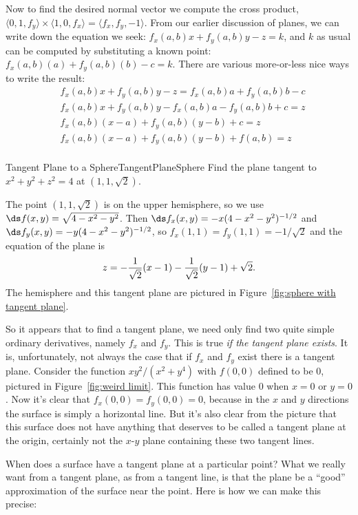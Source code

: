Now to find the desired normal vector we compute the cross product,
$\langle 0,1,f_y\rangle\times\langle 1,0,f_x\rangle=
\langle f_x,f_y,-1\rangle$. From our earlier discussion of planes, we
can write down the equation we seek: $f_x(a,b)x+f_y(a,b)y-z=k$, and
$k$ as usual can be computed by substituting a known point:
$f_x(a,b)(a)+f_y(a,b)(b)-c=k$. There are various more-or-less nice
ways to write the result:
\begin{align*}
&f_x(a,b)x+f_y(a,b)y-z=f_x(a,b)a+f_y(a,b)b-c	\\
&f_x(a,b)x+f_y(a,b)y-f_x(a,b)a-f_y(a,b)b+c=z	\\
&f_x(a,b)(x-a)+f_y(a,b)(y-b)+c=z	\\
&f_x(a,b)(x-a)+f_y(a,b)(y-b)+f(a,b)=z	\\
\end{align*}

\begin{example}{Tangent Plane to a Sphere}{TangentPlaneSphere}
Find the plane tangent to $x^2+y^2+z^2=4$ at
$(1,1,\sqrt2)$.
\end{example}
\begin{solution}
The point $(1,1,\sqrt2)$ is on the upper hemisphere, so 
we use $\ds f(x,y)=\sqrt{4-x^2-y^2}$. Then 
$\ds f_x(x,y)=-x(4-x^2-y^2)^{-1/2}$ and $\ds
f_y(x,y)=-y(4-x^2-y^2)^{-1/2}$, so $f_x(1,1)=f_y(1,1)=-1/\sqrt2$
and the equation of the plane is 
$$z=-{1\over\sqrt2}(x-1)-{1\over\sqrt2}(y-1)+\sqrt2.$$
The hemisphere and this tangent plane are pictured in
Figure~\ref{fig:sphere with tangent plane}.
\end{solution}

So it appears that to find a tangent plane, we need only find two
quite simple ordinary derivatives, namely $f_x$ and $f_y$. This is
true {\em if the tangent plane exists}. It is, unfortunately, not
always the
case that if $f_x$ and $f_y$ exist there is a tangent plane. 
Consider the function  $xy^2/(x^2+y^4)$ with $f(0,0)$ defined to be 0, pictured in 
Figure~\ref{fig:weird limit}. This function has value 0 when $x=0$
or $y=0$. Now it's clear that $f_x(0,0)=f_y(0,0)=0$, because in the
$x$ and $y$ directions the surface is simply a horizontal line. But
it's also clear from the picture that this surface does not have
anything that deserves to be called a tangent plane at the origin,
certainly not the $x$-$y$ plane containing these two tangent lines.

When does a surface have a tangent plane at a particular point? What
we really want from a tangent plane, as from a tangent line, is that
the plane be a ``good'' approximation of the surface near the
point. Here is how we can make this precise:

